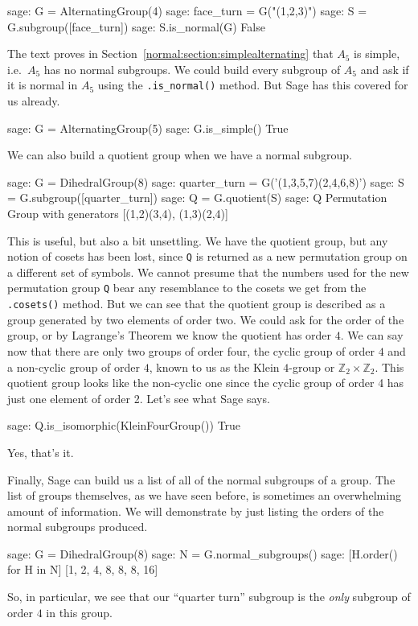 %
\begin{sageexample}
sage: G = AlternatingGroup(4)
sage: face_turn = G("(1,2,3)")
sage: S = G.subgroup([face_turn])
sage: S.is_normal(G)
False
\end{sageexample}
%
The text proves in Section~\ref{normal:section:simplealternating} that $A_5$ is simple, i.e.\ $A_5$ has no normal subgroups.  We could build every subgroup of $A_5$ and ask if it is normal in $A_5$ using the \verb?.is_normal()? method.  But Sage has this covered for us already.
%
\begin{sageexample}
sage: G = AlternatingGroup(5)
sage: G.is_simple()
True
\end{sageexample}
%
We can also build a quotient group when we have a normal subgroup.
%
\begin{sageexample}
sage: G = DihedralGroup(8)
sage: quarter_turn = G('(1,3,5,7)(2,4,6,8)')
sage: S = G.subgroup([quarter_turn])
sage: Q = G.quotient(S)
sage: Q
Permutation Group with generators [(1,2)(3,4), (1,3)(2,4)]
\end{sageexample}
%
This is useful, but also a bit unsettling.  We have the quotient group, but any notion of cosets has been lost, since \verb?Q? is returned as a new permutation group on a different set of symbols.  We cannot presume that the numbers used for the new permutation group \verb?Q? bear any resemblance to the cosets we get from the \verb?.cosets()? method.  But we can see that the quotient group is described as a group generated by two elements of order two.  We could ask for the order of the group, or by Lagrange's Theorem we know the quotient has order $4$.  We can say now that there are only two groups of order four, the cyclic group of order $4$ and a non-cyclic group of order $4$, known to us as the Klein $4$-group or ${\mathbb Z}_2\times{\mathbb Z}_2$.  This quotient group looks like the non-cyclic one since the cyclic group of order 4 has just one element of order 2.  Let's see what Sage says.
%
\begin{sageexample}
sage: Q.is_isomorphic(KleinFourGroup())
True
\end{sageexample}
%
Yes, that's it.\par
%
Finally, Sage can build us a list of all of the normal subgroups of a group.  The list of groups themselves, as we have seen before, is sometimes an overwhelming amount of information.  We will demonstrate by just listing the orders of the normal subgroups produced.
%
\begin{sageexample}
sage: G = DihedralGroup(8)
sage: N = G.normal_subgroups()
sage: [H.order() for H in N]
[1, 2, 4, 8, 8, 8, 16]
\end{sageexample}
%
So, in particular, we see that our ``quarter turn'' subgroup is the \emph{only} subgroup of order $4$ in this group.
%
